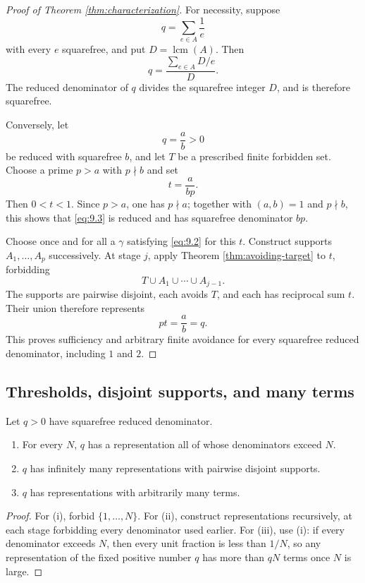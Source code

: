 \begin{proof}[Proof of Theorem \ref{thm:characterization}]
For necessity, suppose
\[
q=\sum_{e\in A}\frac1e
\]
with every $e$ squarefree, and put $D=\operatorname{lcm}(A)$. Then
\[
q=\frac{\sum_{e\in A}D/e}{D}.
\]
The reduced denominator of $q$ divides the squarefree integer $D$, and is therefore squarefree.

Conversely, let
\[
q=\frac ab>0
\]
be reduced with squarefree $b$, and let $T$ be a prescribed finite forbidden set. Choose a prime $p>a$ with $p\nmid b$ and set
\[
t=\frac{a}{bp}.
\tag{9.3}\label{eq:9.3}
\]
Then $0<t<1$. Since $p>a$, one has $p\nmid a$; together with $(a,b)=1$ and $p\nmid b$, this shows that \eqref{eq:9.3} is reduced and has squarefree denominator $bp$.

Choose once and for all a $\gamma$ satisfying \eqref{eq:9.2} for this $t$. Construct supports $A_1,\ldots,A_p$ successively. At stage $j$, apply Theorem \ref{thm:avoiding-target} to $t$, forbidding
\[
T\cup A_1\cup\cdots\cup A_{j-1}.
\]
The supports are pairwise disjoint, each avoids $T$, and each has reciprocal sum $t$. Their union therefore represents
\[
pt=\frac ab=q.
\]
This proves sufficiency and arbitrary finite avoidance for every squarefree reduced denominator, including $1$ and $2$.
\end{proof}

\subsection{Thresholds, disjoint supports, and many terms}

\begin{corollary}\label{cor:qualitative-abundance}
Let $q>0$ have squarefree reduced denominator.
\begin{enumerate}[label=\textup{(\roman*)}]
\item For every $N$, $q$ has a representation all of whose denominators exceed $N$.
\item $q$ has infinitely many representations with pairwise disjoint supports.
\item $q$ has representations with arbitrarily many terms.
\end{enumerate}
\end{corollary}

\begin{proof}
For (i), forbid $\{1,\ldots,N\}$. For (ii), construct representations recursively, at each stage forbidding every denominator used earlier. For (iii), use (i): if every denominator exceeds $N$, then every unit fraction is less than $1/N$, so any representation of the fixed positive number $q$ has more than $qN$ terms once $N$ is large.
\end{proof}

